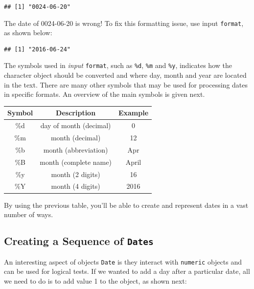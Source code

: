 \documentclass[11pt,]{book}
\newenvironment{Shaded}{\begin{snugshade}}{\end{snugshade}}
\newcommand{\KeywordTok}[1]{\textcolor[rgb]{0.27,0.27,0.27}{\textbf{#1}}}
\newcommand{\DataTypeTok}[1]{\textcolor[rgb]{0.27,0.27,0.27}{#1}}
\newcommand{\StringTok}[1]{\textcolor[rgb]{0.5,0.5,0.5}{#1}}
\newcommand{\CommentTok}[1]{\textcolor[rgb]{0.56,0.35,0.01}{\textit{#1}}}
\newcommand{\NormalTok}[1]{#1}
\begin{document}
\begin{verbatim}
## [1] "0024-06-20"
\end{verbatim}

The date of 0024-06-20 is wrong! To fix this formatting issue, use input
\texttt{format}, as shown below:

\begin{Shaded}
\end{Shaded}

\begin{verbatim}
## [1] "2016-06-24"
\end{verbatim}

The symbols used in \emph{input} \texttt{format}, such as \texttt{\%d},
\texttt{\%m} and \texttt{\%y}, indicates how the character object should
be converted and where day, month and year are located in the text.
There are many other symbols that may be used for processing dates in
specific formats. An overview of the main symbols is given next.

\begin{longtable}[]{@{}ccc@{}}
\toprule
Symbol & Description & Example\tabularnewline
\midrule
\endhead
\%d & day of month (decimal) & 0\tabularnewline
\%m & month (decimal) & 12\tabularnewline
\%b & month (abbreviation) & Apr\tabularnewline
\%B & month (complete name) & April\tabularnewline
\%y & month (2 digits) & 16\tabularnewline
\%Y & month (4 digits) & 2016\tabularnewline
\bottomrule
\end{longtable}

By using the previous table, you'll be able to create and represent
dates in a vast number of ways.

\subsection{\texorpdfstring{Creating a Sequence of
\texttt{Dates}}{Creating a Sequence of Dates}}\label{creating-a-sequence-of-dates}

An interesting aspect of objects \texttt{Date} is they interact with
\texttt{numeric} objects and can be used for logical tests. If we wanted
to add a day after a particular date, all we need to do is to add value
1 to the object, as shown next: 
\end{document}
